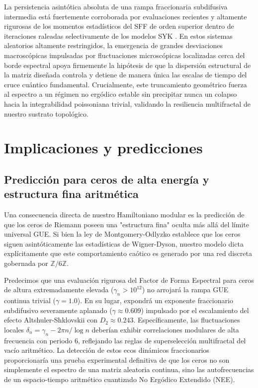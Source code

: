 \documentclass[aps,prl,preprint,superscriptaddress,floatfix]{revtex4-2}
\newcommand{\Zmod}{\mathbb{Z}/6\mathbb{Z}}
\begin{document}
La persistencia asintótica absoluta de una rampa fraccionaria subdifusiva intermedia está fuertemente corroborada por evaluaciones recientes y altamente rigurosas de los momentos estadísticos del SFF de orden superior dentro de iteraciones raleadas selectivamente de los modelos SYK \cite{Legramandi2024}. En estos sistemas aleatorios altamente restringidos, la emergencia de grandes desviaciones macroscópicas impulsadas por fluctuaciones microscópicas localizadas cerca del borde espectral apoya firmemente la hipótesis de que la dispersión estructural de la matriz diseñada controla y detiene de manera única las escalas de tiempo del cruce cuántico fundamental. Crucialmente, este truncamiento geométrico fuerza al espectro a un régimen no ergódico estable sin precipitar nunca un colapso hacia la integrabilidad poissoniana trivial, validando la resiliencia multifractal de nuestro sustrato topológico.

\section{Implicaciones y predicciones}

\subsection{Predicción para ceros de alta energía y estructura fina aritmética}

Una consecuencia directa de nuestro Hamiltoniano modular es la predicción de que los ceros de Riemann poseen una "estructura fina" oculta más allá del límite universal GUE. Si bien la ley de Montgomery-Odlyzko establece que los ceros siguen asintóticamente las estadísticas de Wigner-Dyson, nuestro modelo dicta explícitamente que este comportamiento caótico es generado por una red discreta gobernada por $\Zmod$.

Predecimos que una evaluación rigurosa del Factor de Forma Espectral para ceros de altura extremadamente elevada ($\gamma_n > 10^{12}$) no arrojará la rampa GUE continua trivial ($\gamma = 1.0$). En su lugar, expondrá un exponente fraccionario subdifusivo severamente aplanado ($\gamma \approx 0.609$) impulsado por el escalamiento del efecto Altshuler-Shklovskii con $D_2 \approx 0.243$. Específicamente, las fluctuaciones locales $\delta_n = \gamma_n - 2\pi n/\log n$ deberían exhibir correlaciones modulares de alta frecuencia con periodo 6, reflejando las reglas de superselección multifractal del vacío aritmético. La detección de estos ecos dinámicos fraccionarios proporcionaría una prueba experimental definitiva de que los ceros no son simplemente el espectro de una matriz aleatoria continua, sino las autofrecuencias de un espacio-tiempo aritmético cuantizado No Ergódico Extendido (NEE).
\end{document}
